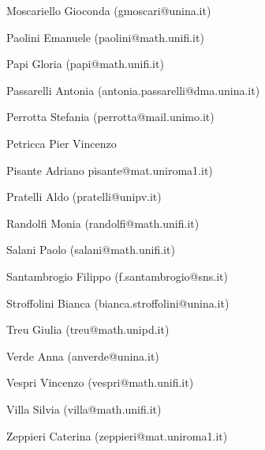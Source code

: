 \documentclass[12pt]{article}
\begin{document}
Moscariello Gioconda (gmoscari@unina.it)

Paolini Emanuele (paolini@math.unifi.it)

Papi Gloria (papi@math.unifi.it)

Passarelli Antonia (antonia.passarelli@dma.unina.it)

Perrotta Stefania (perrotta@mail.unimo.it)

Petricca Pier Vincenzo  

Pisante Adriano pisante@mat.uniroma1.it)

Pratelli Aldo (pratelli@unipv.it)

Randolfi Monia (randolfi@math.unifi.it)

Salani Paolo (salani@math.unifi.it)

Santambrogio Filippo (f.santambrogio@sns.it)

Stroffolini Bianca (bianca.stroffolini@unina.it)

Treu Giulia (treu@math.unipd.it)

Verde Anna (anverde@unina.it)

Vespri Vincenzo (vespri@math.unifi.it)

Villa Silvia (villa@math.unifi.it)

Zeppieri Caterina (zeppieri@mat.uniroma1.it)

 
\end{document}
